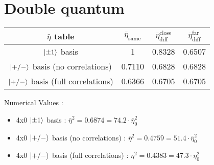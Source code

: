 \documentclass[a4paper]{article}
\begin{document}
\section{Double quantum}
\begin{tabular}{cccc}
\hline
$\bar{\eta}$ table & $\bar{\eta}_\textrm{same}$ & $\bar{\eta}_\textrm{diff}^\textrm{close}$ & $\bar{\eta}_\textrm{diff}^\textrm{far}$ \\
\hline
$\ket{\pm 1}$ basis & 1 & 0.8328 & 0.6507 \\
$\ket{+/-}$ basis (no correlations) & 0.7110  & 0.6828 & 0.6828 \\
$\ket{+/-}$ basis (full correlations) & 0.6366 & 0.6705 & 0.6705  \\
\hline
\end{tabular}

\bigskip
Numerical Values :
\begin{itemize}
\medskip

\item 4x0 $\ket{\pm 1}$ basis : $\bar{\eta}^2 = 0.6874 = 74.2 \cdot \bar{\eta}^2_0$
\item 4x0 $\ket{+/-}$ basis (no correlations) : $\bar{\eta}^2 = 0.4759 = 51.4 \cdot \bar{\eta}^2_0$
\item 4x0 $\ket{+/-}$ basis (full correlations) : $\bar{\eta}^2 = 0.4383 = 47.3 \cdot \bar{\eta}^2_0$

\end{itemize}
\end{document}
